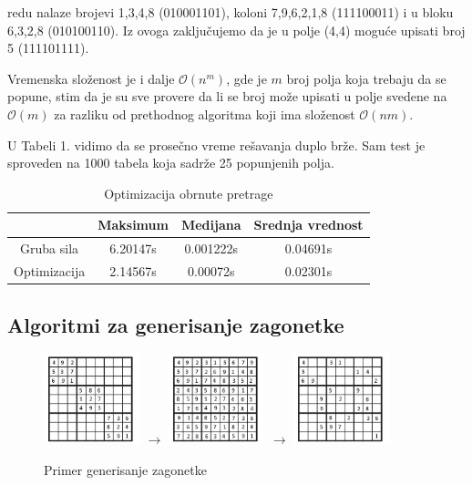 \documentclass[a4paper]{article}
\begin{document}
    redu nalaze brojevi 1,3,4,8 (010001101), koloni 7,9,6,2,1,8 (111100011) i u bloku 6,3,2,8 (010100110). Iz ovoga zaključujemo da je u polje (4,4)
    moguće upisati broj 5 (111101111).
    \par Vremenska složenost je i dalje $\mathcal{O}(n^m)$, gde je $m$ broj polja koja trebaju da se popune, stim da je su sve provere da li se broj može upisati 
    u polje svedene na $\mathcal{O}(m)$ za razliku od prethodnog algoritma koji ima složenost $\mathcal{O}(nm)$. 
    \par U Tabeli 1. vidimo da se prosečno vreme rešavanja duplo brže. Sam test je sproveden na 1000 tabela koja sadrže 25 popunjenih polja.
    \begin{table}[h]
        \centering
        \begin{tabular}{ |c|c|c|c|}
            \hline
            & Maksimum & Medijana & Srednja vrednost \\
            \hline
            Gruba sila & 6.20147s & 0.001222s & 0.04691s \\
            \hline
            Optimizacija & 2.14567s & 0.00072s & 0.02301s \\
            \hline
        \end{tabular}
        \caption{Optimizacija obrnute pretrage}
    \end{table}

    \subsection{Algoritmi za generisanje zagonetke}
    \begin{figure}[H]
        \centering
        \includegraphics[width=0.25\textwidth, height=0.25\textwidth]{img/diag-fill.jpg}
        $\longrightarrow$
        \includegraphics[width=0.25\textwidth, height=0.25\textwidth]{img/full.jpg}
        $\longrightarrow$
        \includegraphics[width=0.25\textwidth, height=0.25\textwidth]{img/generated.jpg}
        \caption{Primer generisanje zagonetke}
    \end{figure}
\end{document}
